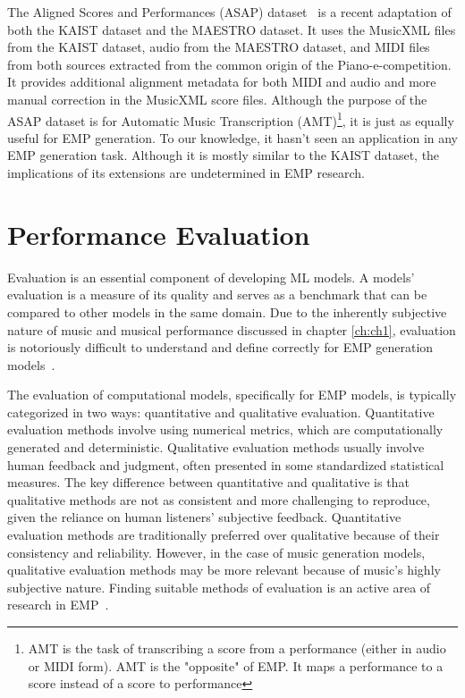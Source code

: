 The Aligned Scores and Performances (ASAP) dataset~\cite{foscarin2020asap} is a recent adaptation of both the KAIST dataset and the MAESTRO dataset. It uses the MusicXML files from the KAIST dataset, audio from the MAESTRO dataset, and MIDI files from both sources extracted from the common origin of the Piano-e-competition. It provides additional alignment metadata for both MIDI and audio and more manual correction in the MusicXML score files. Although the purpose of the ASAP dataset is for Automatic Music Transcription (AMT)\footnote{AMT is the task of transcribing a score from a performance (either in audio or MIDI form). AMT is the "opposite" of EMP. It maps a performance to a score instead of a score to performance}, it is just as equally useful for EMP generation. To our knowledge, it hasn't seen an application in any EMP generation task. Although it is mostly similar to the KAIST dataset, the implications of its extensions are undetermined in EMP research. 


\section{Performance Evaluation}\label{sec:evaluation}
Evaluation is an essential component of developing ML models. A models' evaluation is a measure of its quality and serves as a benchmark that can be compared to other models in the same domain. Due to the inherently subjective nature of music and musical performance discussed in chapter \ref{ch:ch1}, evaluation is notoriously difficult to understand and define correctly for EMP generation models~\cite{cancino2018computational}. 

The evaluation of computational models, specifically for EMP models, is typically categorized in two ways: quantitative and qualitative evaluation. Quantitative evaluation methods involve using numerical metrics, which are computationally generated and deterministic. Qualitative evaluation methods usually involve human feedback and judgment, often presented in some standardized statistical measures. The key difference between quantitative and qualitative is that qualitative methods are not as consistent and more challenging to reproduce, given the reliance on human listeners' subjective feedback. Quantitative evaluation methods are traditionally preferred over qualitative because of their consistency and reliability. However, in the case of music generation models, qualitative evaluation methods may be more relevant because of music's highly subjective nature. Finding suitable methods of evaluation is an active area of research in EMP~\cite{cancino2018computational}. 

